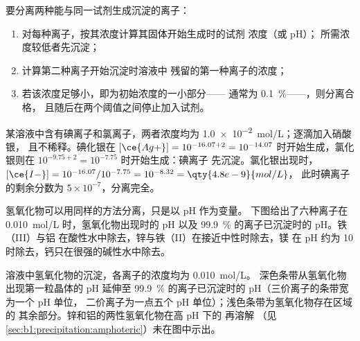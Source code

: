 \begin{method}[选择性沉淀]\label{met:b1:precipitation:selective}
要分离两种能与同一试剂生成沉淀的离子：
\begin{enumerate}
  \item 对每种离子，按其浓度计算其固体开始生成时的试剂
        浓度（或 pH）；
        所需浓度较低者先沉淀；
  \item 计算第二种离子开始沉淀时溶液中
        残留的第一种离子的浓度；
  \item 若该浓度足够小，即为初始浓度的一小部分——
        通常为 \qty{0.1}{\percent}——，则分离合格，
        且随后在两个阈值之间停止加入试剂。
\end{enumerate}
\end{method}

\begin{example}[碘离子与氯离子]\label{ex:b1:precipitation:i-cl}
某溶液中含有碘离子和氯离子，两者浓度均为
\qty{1.0e-2}{mol/L}；逐滴加入硝酸银，
且不稀释。碘化银在 $[\ce{Ag+}] = 10^{-16.07 + 2} =
10^{-14.07}$ 时开始生成，氯化银则在 $10^{-9.75 + 2} = 10^{-7.75}$ 时开始生成：碘离子
先沉淀。氯化银出现时，
$[\ce{I-}] = 10^{-16.07}/10^{-7.75} = 10^{-8.32} = \qty{4.8e-9}{mol/L}$，
此时碘离子的剩余分数为 $5 \times 10^{-7}$，分离完全。
\end{example}

氢氧化物可以用同样的方法分离，只是以 pH 作为变量。
下图给出了六种离子在
\qty{0.010}{mol/L} 时，氢氧化物出现时的 pH 以及
\qty{99.9}{\percent} 的离子已沉淀时的 pH。铁（III）与铝
在酸性水中除去，锌与铁（II）在接近中性时除去，镁
在 pH 约为 10 时除去，钙只在很强的碱性水中除去。

\begin{omfigure}

{\small 溶液中氢氧化物的沉淀，各离子的浓度均为 \qty{0.010}{mol/L}。
深色条带从氢氧化物出现第一粒晶体的 pH 延伸至
\qty{99.9}{\percent} 的离子已沉淀时的 pH（三价离子的条带宽为一个 pH 单位，
二价离子为一点五个 pH 单位）；浅色条带为氢氧化物存在区域的
其余部分。锌和铝的两性氢氧化物在高 pH 下的
再溶解
（见\cref{sec:b1:precipitation:amphoteric}）未在图中示出。}
\end{omfigure}

